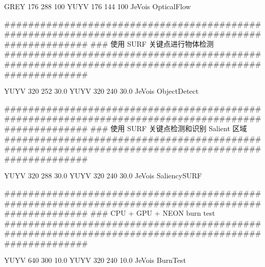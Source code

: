 \begin{DoxyVerb}
GREY 176 288 100 YUYV 176 144 100 JeVois OpticalFlow

####################################################################################################
### 使用 SURF 关键点进行物体检测 
####################################################################################################

YUYV 320 252 30.0 YUYV 320 240 30.0 JeVois ObjectDetect

####################################################################################################
### 使用 SURF 关键点检测和识别 Salient 区域 
####################################################################################################

YUYV 320 288 30.0 YUYV 320 240 30.0 JeVois SaliencySURF

####################################################################################################
### CPU + GPU + NEON burn test
####################################################################################################

YUYV 640 300 10.0 YUYV 320 240 10.0 JeVois BurnTest\end{DoxyVerb}
 